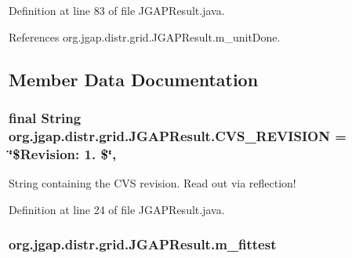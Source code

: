 Definition at line 83 of file J\-G\-A\-P\-Result.\-java.



References org.\-jgap.\-distr.\-grid.\-J\-G\-A\-P\-Result.\-m\-\_\-unit\-Done.



\subsection{Member Data Documentation}
\hypertarget{classorg_1_1jgap_1_1distr_1_1grid_1_1_j_g_a_p_result_a41b591ae5da4584bf73415a4d4bdb980}{
\subsubsection[{C\-V\-S\-\_\-\-R\-E\-V\-I\-S\-I\-O\-N}]{\setlength{\rightskip}{0pt plus 5cm}final String org.\-jgap.\-distr.\-grid.\-J\-G\-A\-P\-Result.\-C\-V\-S\-\_\-\-R\-E\-V\-I\-S\-I\-O\-N = \char`\"{}\$Revision\-: 1. \$\char`\"{}\hspace{0.3cm}{\ttfamily [static]}, {\ttfamily [private]}}}\label{classorg_1_1jgap_1_1distr_1_1grid_1_1_j_g_a_p_result_a41b591ae5da4584bf73415a4d4bdb980}
String containing the C\-V\-S revision. Read out via reflection! 

Definition at line 24 of file J\-G\-A\-P\-Result.\-java.

\hypertarget{classorg_1_1jgap_1_1distr_1_1grid_1_1_j_g_a_p_result_a2702f8ef49d052fa6f3d5bd663276235}{
\subsubsection[{m\-\_\-fittest}]{ org.\-jgap.\-distr.\-grid.\-J\-G\-A\-P\-Result.\-m\-\_\-fittest\hspace{0.3cm}{\ttfamily [private]}}}\label{classorg_1_1jgap_1_1distr_1_1grid_1_1_j_g_a_p_result_a2702f8ef49d052fa6f3d5bd663276235}


